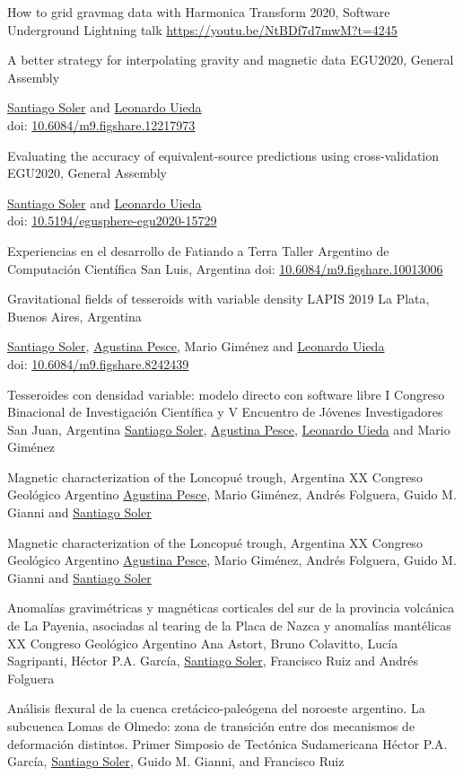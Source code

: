 \documentclass[a4paper,12pt,sans,colorlinks]{moderncv/moderncv}
\newcommand{\me}{\href{https://www.santisoler.com}{Santiago Soler}}
\newcommand{\agustina}{\href{https://aguspesce.github.io}{Agustina Pesce}}
\newcommand{\guido}{Guido M. Gianni}
\newcommand{\leo}{\href{https://www.leouieda.com}{Leonardo Uieda}}
\newcommand{\mario}{Mario Giménez}
\newcommand{\folguera}{Andrés Folguera}
\newcommand{\pichu}{Héctor P.A. García}
\newcommand{\paco}{Francisco Ruiz}
\newcommand{\doi}[1]{
    \href{https://doi.org/#1}{#1}
}
\begin{document}
{How to grid gravmag data with Harmonica}
{Transform 2020, Software Underground}
{}
{Lightning talk}
{\url{https://youtu.be/NtBDf7d7mwM?t=4245}}

{A better strategy for interpolating gravity and magnetic data}
{EGU2020, General Assembly}
{}
{}
{
    \me{} and \leo{}
    \\
    doi: \doi{10.6084/m9.figshare.12217973}
}

{
    Evaluating the accuracy of equivalent-source predictions using
    cross-validation
}
{EGU2020, General Assembly}
{}
{}
{
    \me{} and \leo{}
    \\
    doi: \doi{10.5194/egusphere-egu2020-15729}
}

{Experiencias en el desarrollo de Fatiando a Terra}
{Taller Argentino de Computación Científica}
{San Luis, Argentina}
{}
{doi: \doi{10.6084/m9.figshare.10013006}}

{Gravitational fields of tesseroids with variable density}
{LAPIS 2019}
{La Plata, Buenos Aires, Argentina}
{}
{
    \me{}, \agustina{}, \mario{} and \leo{}
    \\
    doi: \doi{10.6084/m9.figshare.8242439}
}

{Tesseroides con densidad variable: modelo directo con software libre}
{
    I Congreso Binacional de Investigación Científica y V Encuentro de Jóvenes
    Investigadores
}
{San Juan, Argentina}
{}
{\me{}, \agustina{}, \leo{} and \mario{}}

{Magnetic characterization of the Loncopué trough, Argentina}
{XX Congreso Geológico Argentino}
{}
{}
{\agustina{}, \mario{}, \folguera{}, \guido{} and \me{}}

{Magnetic characterization of the Loncopué trough, Argentina}
{XX Congreso Geológico Argentino}
{}
{}
{\agustina{}, \mario{}, \folguera{}, \guido{} and \me{}}

{
    Anomalías gravimétricas y magnéticas corticales del sur de la provincia
    volcánica de La Payenia, asociadas al tearing de la Placa de Nazca
    y anomalías mantélicas
}
{XX Congreso Geológico Argentino}
{}
{}
{
    Ana Astort, Bruno Colavitto, Lucía Sagripanti, \pichu{}, \me{}, \paco{}
    and \folguera{}
}

{
   Análisis flexural de la cuenca cretácico-paleógena del noroeste
   argentino. La subcuenca Lomas de Olmedo: zona de transición entre dos
   mecanismos de deformación distintos.
}
{Primer Simposio de Tectónica Sudamericana}
{}
{}
{\pichu{}, \me{}, \guido{}, and \paco{}}
\end{document}
